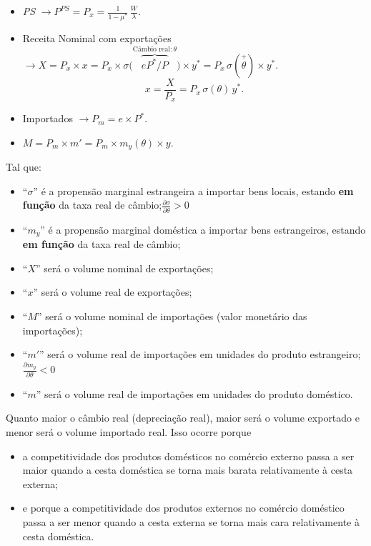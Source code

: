 \documentclass[a4paper,12pt]{article}[abntex2]
\begin{document}
\begin{itemize}
  \item \emph{PS} \(\to P^{PS} = P_x = \tfrac{1}{1-\mu^*}\,\tfrac{W}{\lambda}\).
  \item Receita Nominal com exportações \(\to X = P_x \times x = P_x \times \sigma\bigl(\overbrace{eP^*/P}^{\text{Câmbio real}:\theta}\bigr)\times y^* = P_x \,\sigma(\overset{+}{\theta})\times y^*\).
    \[
      x = \frac{X}{P_x} = P_x \,\sigma(\theta)\,y^*.
    \]
  \item Importados \(\to P_m = e \times P^*\).
  \item \(M = P_m \times m' = P_m \times m_y(\theta) \times y\).
\end{itemize}

Tal que:
\begin{itemize}
  \item “\(\sigma\)” é a propensão marginal estrangeira a importar bens locais, estando \textbf{em função} da taxa real de câmbio;\(\frac{\partial \sigma}{\partial \theta}>0\)
  \item “\(m_y\)” é a propensão marginal doméstica a importar bens estrangeiros, estando \textbf{em função} da taxa real de câmbio;
  \item “\(X\)” será o volume nominal de exportações;
  \item “\(x\)” será o volume real de exportações;
  \item “\(M\)” será o volume nominal de importações (valor monetário das importações);
  \item “\(m'\)” será o volume real de importações em unidades do produto estrangeiro;\(\frac{\partial m_y}{\partial \theta}<0\)
  \item “\(m\)” será o volume real de importações em unidades do produto doméstico.
\end{itemize}

Quanto maior o câmbio real (depreciação real), maior será o volume exportado e menor será o volume importado real. Isso ocorre porque
\begin{itemize}
  \item a competitividade dos produtos domésticos no comércio externo passa a ser maior quando a cesta doméstica se torna mais barata relativamente à cesta externa;
  \item e porque a competitividade dos produtos externos no comércio doméstico passa a ser menor quando a cesta externa se torna mais cara relativamente à cesta doméstica.
\end{itemize}
\end{document}
